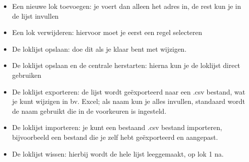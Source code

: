 \documentclass[12pt,a4paper]{report}
\begin{document}
\begin{itemize}
\item Een nieuwe lok toevoegen: je voert dan alleen het adres in, de rest kun je in de lijst invullen
\item Een lok verwijderen: hiervoor moet je eerst een regel selecteren
\item De loklijst opslaan: doe dit als je klaar bent met wijzigen.
\item De loklijst opslaan en de centrale herstarten: hierna kun je de loklijst direct gebruiken
\item De loklijst exporteren: de lijst wordt geëxporteerd naar een .csv bestand, wat je kunt wijzigen in bv. Excel; als naam kun je alles invullen, standaard wordt de naam gebruikt die in de voorkeuren is ingesteld.
\item De loklijst importeren: je kunt een bestaand .csv bestand importeren, bijvoorbeeld een bestand die je zelf hebt ge\"{e}xporteerd en aangepast.
\item De loklijst wissen: hierbij wordt de hele lijst leeggemaakt, op lok 1 na.
\end{itemize}
\end{document}
